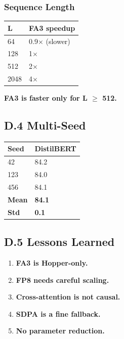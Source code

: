 \subsubsection{Sequence Length}

\begin{table}[H]
\centering
\small
\begin{tabular}{ll}
\toprule
\textbf{L} & \textbf{FA3 speedup} \\
\midrule
64 & 0.9$\times$ (slower) \\
128 & 1$\times$ \\
512 & 2$\times$ \\
2048 & 4$\times$ \\
\bottomrule
\end{tabular}
\end{table}

\textbf{FA3 is faster only for L $\ge$ 512.}

\subsection{D.4 Multi-Seed}

\begin{table}[H]
\centering
\small
\begin{tabular}{ll}
\toprule
\textbf{Seed} & \textbf{DistilBERT} \\
\midrule
42 & 84.2 \\
123 & 84.0 \\
456 & 84.1 \\
\textbf{Mean} & \textbf{84.1} \\
\textbf{Std} & \textbf{0.1} \\
\bottomrule
\end{tabular}
\end{table}

\subsection{D.5 Lessons Learned}

\begin{enumerate}
\item \textbf{FA3 is Hopper-only.}
\item \textbf{FP8 needs careful scaling.}
\item \textbf{Cross-attention is not causal.}
\item \textbf{SDPA is a fine fallback.}
\item \textbf{No parameter reduction.}

\end{enumerate}
